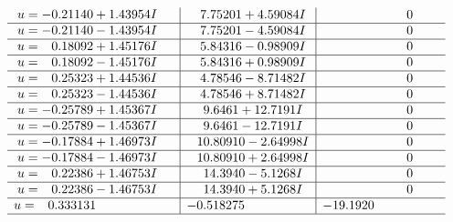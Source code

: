 \documentclass[1p]{elsarticle_modified}
\theoremstyle{definition}
\begin{document}
$$\begin{array}{c|c|c}
\begin{aligned}
u &= -0.21140 + 1.43954 I\end{aligned}
 & \phantom{-}7.75201 + 4.59084 I & \phantom{-0.000000 } 0 \\ \hline\begin{aligned}
u &= -0.21140 - 1.43954 I\end{aligned}
 & \phantom{-}7.75201 - 4.59084 I & \phantom{-0.000000 } 0 \\ \hline\begin{aligned}
u &= \phantom{-}0.18092 + 1.45176 I\end{aligned}
 & \phantom{-}5.84316 - 0.98909 I & \phantom{-0.000000 } 0 \\ \hline\begin{aligned}
u &= \phantom{-}0.18092 - 1.45176 I\end{aligned}
 & \phantom{-}5.84316 + 0.98909 I & \phantom{-0.000000 } 0 \\ \hline\begin{aligned}
u &= \phantom{-}0.25323 + 1.44536 I\end{aligned}
 & \phantom{-}4.78546 - 8.71482 I & \phantom{-0.000000 } 0 \\ \hline\begin{aligned}
u &= \phantom{-}0.25323 - 1.44536 I\end{aligned}
 & \phantom{-}4.78546 + 8.71482 I & \phantom{-0.000000 } 0 \\ \hline\begin{aligned}
u &= -0.25789 + 1.45367 I\end{aligned}
 & \phantom{-}9.6461 + 12.7191 I & \phantom{-0.000000 } 0 \\ \hline\begin{aligned}
u &= -0.25789 - 1.45367 I\end{aligned}
 & \phantom{-}9.6461 - 12.7191 I & \phantom{-0.000000 } 0 \\ \hline\begin{aligned}
u &= -0.17884 + 1.46973 I\end{aligned}
 & \phantom{-}10.80910 - 2.64998 I & \phantom{-0.000000 } 0 \\ \hline\begin{aligned}
u &= -0.17884 - 1.46973 I\end{aligned}
 & \phantom{-}10.80910 + 2.64998 I & \phantom{-0.000000 } 0 \\ \hline\begin{aligned}
u &= \phantom{-}0.22386 + 1.46753 I\end{aligned}
 & \phantom{-}14.3940 - 5.1268 I & \phantom{-0.000000 } 0 \\ \hline\begin{aligned}
u &= \phantom{-}0.22386 - 1.46753 I\end{aligned}
 & \phantom{-}14.3940 + 5.1268 I & \phantom{-0.000000 } 0 \\ \hline\begin{aligned}
u &= \phantom{-}0.333131\phantom{ +0.000000I}\end{aligned}
 & -0.518275\phantom{ +0.000000I} & -19.1920\phantom{ +0.000000I}\\
 \hline 
 \end{array}$$\newpage
\end{document}
